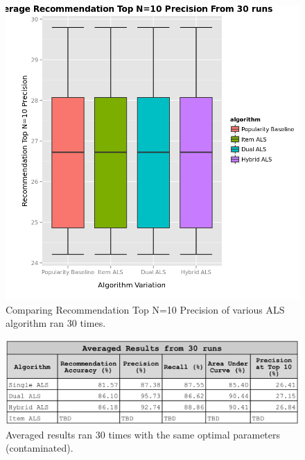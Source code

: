 \begin{figure}
\centering
\includegraphics[scale=0.7]{recent_images/top_n.png}
\caption{Comparing Recommendation Top N=10 Precision of various ALS algorithm ran 30 times.}
\label{fig:algorithms}
\end{figure}

\begin{figure}
\centering
\includegraphics[scale=0.4]{images/results_tuning.png}
\caption{Averaged results ran 30 times with the same optimal parameters (contaminated).}
\label{fig:results}
\end{figure}

